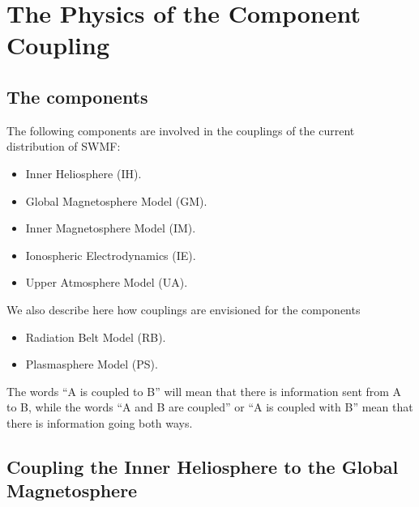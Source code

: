 %

\chapter{The Physics of the Component Coupling}

\section{The components}

The following components are involved in the couplings
of the current distribution of SWMF:
\begin{itemize}

\item Inner Heliosphere (IH).

\item Global Magnetosphere Model (GM).

\item Inner Magnetosphere Model (IM).

\item Ionospheric Electrodynamics (IE).

\item Upper Atmosphere Model (UA).

\end{itemize}
We also describe here how couplings are envisioned for
the components
\begin{itemize}

\item Radiation Belt Model (RB).

\item Plasmasphere Model (PS).

\end{itemize}
The words ``A is coupled to B'' will mean that there is
information sent from A to B, while the words ``A and B are
coupled'' or ``A is coupled with B'' mean 
that there is information going both ways.

\section{Coupling the Inner Heliosphere to the Global Magnetosphere}

